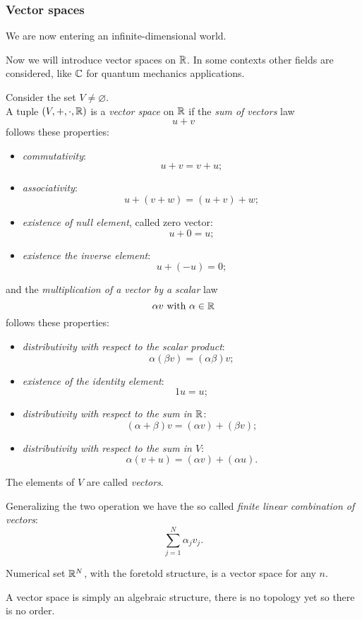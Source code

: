 \subsubsection{Vector spaces}

We are now entering an infinite-dimensional world. %

Now we will introduce vector spaces on $\mathbb R$. In some contexts other fields are considered, like $\mathbb C$ for quantum mechanics applications.
\begin{defn}\label{defn-vector-spaces}
	Consider the set $V\neq \varnothing$.\\
	A tuple $(V,+,\cdot,\mathbb R)$ is a \emph{vector space} on $\mathbb R$ if the \textit{sum of vectors} law $$u + v$$ follows these properties:
	\begin{itemize}
		\item \emph{commutativity}: $$u+v = v+u;$$
		\item \emph{associativity}: $$u + (v+w) = (u+v)+ w;$$
		\item \emph{existence of null element}, called zero vector: $$u+0 = u;$$
		\item \emph{existence the inverse element}: $$u + (-u) = 0;$$ 
	\end{itemize}
	and the \textit{multiplication of a vector by a scalar} law $$\alpha v \text{ with }\alpha \in \mathbb R$$ follows these properties:
	\begin{itemize}
		\item \emph{distributivity with respect to the scalar product}: $$\alpha(\beta v)=(\alpha \beta) v;$$
		\item \emph{existence of the identity element}: 
		$$1 u = u;$$
		\item \emph{distributivity with respect to the sum in $\mathbb R$}: $$(\alpha + \beta)v = (\alpha v)+(\beta v);$$  
		\item \emph{distributivity with respect to the sum in $V$}: $$\alpha(v+u) = (\alpha v) + (\alpha u ).$$
	\end{itemize}
	The elements of $V$ are called \emph{vectors}.
\end{defn}

Generalizing the two operation we have the so called \textit{finite linear combination of vectors}: 
$$
\sum_{j=1}^N \alpha_j v_j
.
$$

Numerical set $\mathbb R^N$, with the foretold structure, is a vector space for any $n$.

A vector space is simply an algebraic structure, there is no topology yet so there is no order. 

